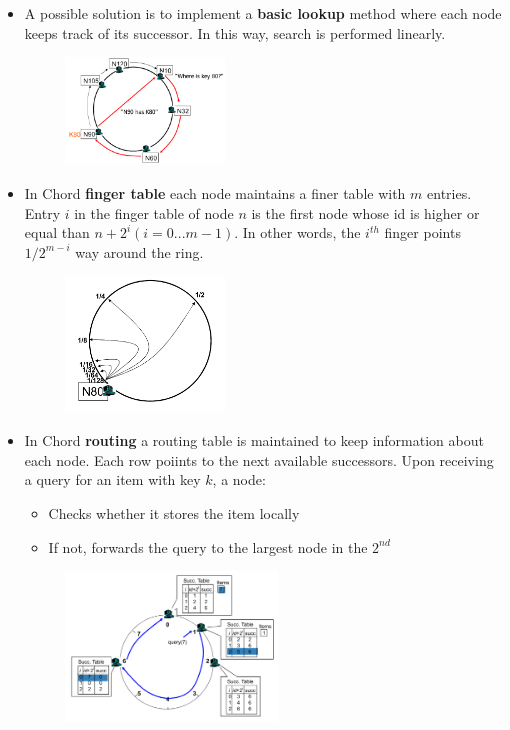 \documentclass[10pt,a4paper]{article}
\begin{document}
\begin{itemize}
\item A possible solution is to implement a \textbf{basic lookup} method where each node keeps track of its successor. In this way, search is performed linearly.
\begin{figure}[h!]
 \hfill \includegraphics[width=120pt]{images/chord-lookup.png}\hspace*{\fill}
  \label{fig:chord-lookup}
\end{figure}
\item In Chord \textbf{finger table} each node maintains a finer table with $m$ entries. Entry $i$ in the finger table of node $n$ is the first node whose id is higher or equal than $n+2^i (i=0...m-1)$. In other words, the $i^{th}$ finger points $1/2^{m-i}$ way around the ring.
\begin{figure}[h!]
 \hfill \includegraphics[width=120pt]{images/chord-finger.png}\hspace*{\fill}
  \label{fig:chord-finger}
\end{figure}
\item In Chord \textbf{routing} a routing table is maintained to keep information about each node. Each row poiints to the next available successors.
 Upon receiving a query for an item with key $k$, a node: 
	\begin{itemize}
		\item Checks whether it stores the item locally
		\item If not, forwards the query to the largest node in the $2^{nd}$
	\end{itemize}
\begin{figure}[h!]
 \hfill \includegraphics[width=160pt]{images/chord-routing.png}\hspace*{\fill}

\end{figure}
\end{itemize}
\end{document}

